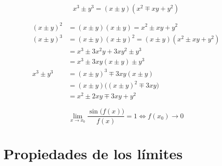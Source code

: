 \begin{mdframed}[style=PropertyFrame]
    \begin{prop}
    \end{prop}
    \begin{equation*}
        x^3 \pm y^3 = (x \pm y)(x^2 \mp xy + y^2)
    \end{equation*}
\end{mdframed}

\begin{align*}
(x \pm y)^2 &= (x \pm y)(x \pm y)=x^2 \pm xy + y^2
\\
(x \pm y)^3 &= (x \pm y)(x \pm y)^2=(x \pm y)(x^2 \pm xy + y^2)
\\
&= x^3 \pm 3x^2y + 3xy^2 \pm y^3
\\
&= x^3 \pm 3xy(x \pm y) \pm y^3
\\
x^3 \pm y^3 &= (x \pm y)^3 \mp 3xy(x\pm y)
\\
&= (x \pm y) \Big( (x\pm y)^2 \mp 3xy \Big)
\\
&= x^2 \pm 2xy \mp 3xy + y^2
\end{align*}


\begin{mdframed}[style=PropertyFrame]
    \begin{prop}
    \end{prop}
    \begin{equation*}
        \lim_{x \to x_0} \dfrac{\sin{\Big( f(x) \Big)}}{f(x)} = 1 \iff f(x_0) \rightarrow 0
    \end{equation*}
\end{mdframed}


\section{Propiedades de los límites}

